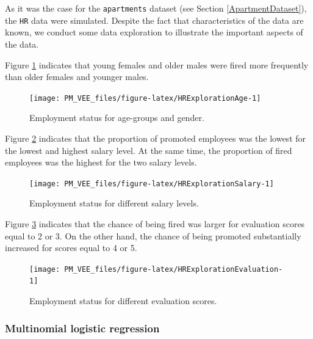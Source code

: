 \documentclass[12pt,]{krantz}
\begin{document}
As it was the case for the \texttt{apartments} dataset (see Section \ref{ApartmentDataset}), the \texttt{HR} data were simulated. Despite the fact that characteristics of the data are known, we conduct some data exploration to illustrate the important aspects of the data.

Figure \ref{fig:HRExplorationAge} indicates that young females and older males were fired more frequently than older females and younger males.

\begin{figure}

{\centering \texttt{[image: PM\_VEE\_files/figure-latex/HRExplorationAge-1]} 

}

\caption{Employment status for age-groups and gender.}\label{fig:HRExplorationAge}
\end{figure}

Figure \ref{fig:HRExplorationSalary} indicates that the proportion of promoted employees was the lowest for the lowest and highest salary level. At the same time, the proportion of fired employees was the highest for the two salary levels.

\begin{figure}

{\centering \texttt{[image: PM\_VEE\_files/figure-latex/HRExplorationSalary-1]} 

}

\caption{Employment status for different salary levels.}\label{fig:HRExplorationSalary}
\end{figure}

Figure \ref{fig:HRExplorationEvaluation} indicates that the chance of being fired was larger for evaluation scores equal to 2 or 3. On the other hand, the chance of being promoted substantially increased for scores equal to 4 or 5.\\

\begin{figure}

{\centering \texttt{[image: PM\_VEE\_files/figure-latex/HRExplorationEvaluation-1]} 

}

\caption{Employment status for different evaluation scores.}\label{fig:HRExplorationEvaluation}
\end{figure}

\hypertarget{model-HR-mr}{%
\subsubsection{Multinomial logistic regression}\label{model-HR-mr}}
\end{document}
